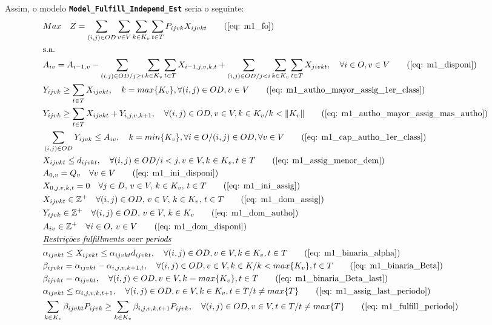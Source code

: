 Assim, o modelo \textbf{ \texttt{Model\_Fulfill\_Independ\_Est}} seria o seguinte:
\allowdisplaybreaks
\begin{align}
	& Max \quad Z = \sum_{(i,j)\in OD} \sum_{v\in V} \sum_{k\in K_v} \sum_{t\in T} P_{ijvk} X_{ijvkt}     \tag{\ref{eq: m1_fo}}   \\
	& \text{s.a.}  \notag \\
	& A_{iv} = A_{i-1,v} - \sum_{(i,j) \in OD/j \geq i} \sum_{k\in K_v}\sum_{t\in T}X_{i-1,j,v,k,t} + \sum_{(i,j) \in OD/j<i} \sum_{k\in K_v}\sum_{t\in T}X_{jivkt}, \quad \forall i \in O, v \in V   \tag{\ref{eq: m1_disponi}} \\
	& Y_{ijvk} \geq  \sum_{t \in T} X_{ijvkt},  \quad k = max\{K_v\}, \forall(i,j) \in OD ,v \in V     \tag{\ref{eq: m1_autho_mayor_assig_1er_class}} \\
	& Y_{ijvk} \geq  \sum_{t \in T} X_{ijvkt} + Y_{i,j,v,k + 1} , \quad \forall(i,j) \in OD, v \in V, k \in K_v / k < \lVert K_v \rVert   \tag{\ref{eq: m1_autho_mayor_assig_mas_autho}} \\
	& \sum_{(i,j) \in OD} Y_{ijvk} \leq A_{iv}, \quad  k = min\{K_v\}, \forall i \in O / (i,j) \in OD,   \forall v \in V       \tag{\ref{eq: m1_cap_autho_1er_class}} \\
	& X_{ijvkt} \leq d_{ijvkt},  \quad \forall (i,j) \in OD / i < j  ,v \in V, k \in K_v, t\in T   \tag{\ref{eq: m1_assig_menor_dem}} \\
	& A_{0,v} = Q_v \quad \forall v \in V  \tag{\ref{eq: m1_ini_disponi}} \\ 
	& X_{0,j,v,k,t} = 0 \quad \forall j \in D,\, v \in V,\, k \in K_v,\, t \in T  \tag{\ref{eq: m1_ini_assig}} \\ 
	& X_{ijvkt} \in \mathbb{Z}^+ \quad \forall(i,j) \in OD,\, v \in V,\, k \in K_v,\, t \in T  \tag{\ref{eq: m1_dom_assig}} \\ 
	& Y_{ijvk} \in \mathbb{Z}^+ \quad \forall(i,j) \in OD,\, v \in V,\, k \in K_v  \tag{\ref{eq: m1_dom_autho}} \\ 
	& A_{iv} \in \mathbb{Z}^+ \quad \forall i \in O,\, v \in V  \tag{\ref{eq: m1_dom_disponi}} \\
	& \textit{\underline{Restrições fulfillments over periods}}         \notag   \\
	& \alpha_{ijvkt} \leq X_{ijvkt} \leq \alpha_{ijvkt}d_{ijvkt}, \quad   \forall(i,j) \in OD, v \in V, k \in K_v, t \in T   \tag{\ref{eq: m1_binaria_alpha}} \\
	& \beta_{ijvkt} = \alpha_{ijvkt} - \alpha_{i,j,v,k+1,t}, \quad \forall (i,j) \in OD, v \in V, k \in K /k < max\{K_v\}, t\in T    \tag{\ref{eq: m1_binaria_Beta}}   \\
	& \beta_{ijvkt} = \alpha_{ijvkt}, \quad   \forall(i,j) \in OD, v \in V, k = max\{K_v\}, t \in T    \tag{\ref{eq: m1_binaria_Beta_last}}   \\
	& \alpha_{ijvkt} \leq \alpha_{i,j,v,k,t+1}, \quad   \forall(i,j) \in OD, v \in V, k \in K_v, t \in T/ t \neq max\{T\}     \tag{\ref{eq: m1_assig_last_periodo}}   \\
	& \sum_{k \in K_v}\beta_{ijvkt}P_{ijvk} \geq \sum_{k \in K_v}\beta_{i,j,v,k,t+1}P_{ijvk},  \quad   \forall(i,j) \in OD, v \in V, t \in T/ t \neq max\{T\}   \tag{\ref{eq: m1_fulfill_periodo}}
\end{align}


